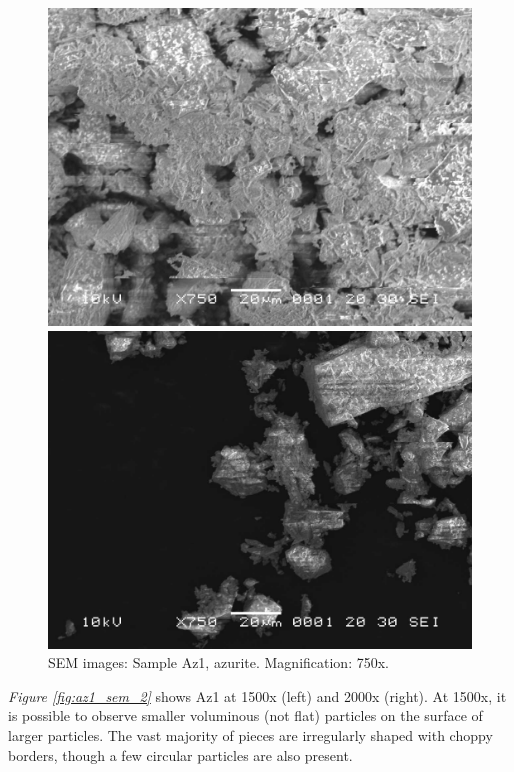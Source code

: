 \begin{figure}[H]
\centering
\begin{minipage}{.45\textwidth}
  \centering
  \includegraphics[width=\linewidth]{Az1_x750_3_220221}
\end{minipage}
\begin{minipage}{.45\textwidth}
  \centering
  \includegraphics[width=\linewidth]{Az1_x750_6_220221}
\end{minipage}
\caption[SEM images: Sample Az1, azurite]{SEM images: Sample Az1, azurite. Magnification: 750x.}
\label{fig:az1_sem_1}
\end{figure}

\textit{Figure \ref{fig:az1_sem_2}} shows Az1 at 1500x (left) and 2000x (right). At 1500x, it is possible to observe smaller voluminous (not flat) particles on the surface of larger particles. The vast majority of pieces are irregularly shaped with choppy borders, though a few circular particles are also present.

